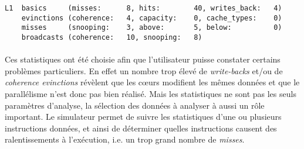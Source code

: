 \begin{lstlisting}
L1  basics     (misses:      8, hits:        40, writes_back:   4)
    evinctions (coherence:   4, capacity:    0, cache_types:    0)
    misses     (snooping:    3, above:       5, below:          0)
    broadcasts (coherence:   10, snooping:   8)
\end{lstlisting}

\paragraph{}
Ces statistiques ont été choisie afin que l'utilisateur puisse constater certains problèmes particuliers. En effet un nombre trop élevé de \emph{write-backs} et/ou de \emph{coherence evinctions} révèlent que les c\oe urs modifient les mêmes données et que le parallélisme n'est donc pas bien réalisé. Mais les statistiques ne sont pas les seuls paramètres d'analyse, la sélection des données à analyser à aussi un rôle important. Le simulateur permet de suivre les statistiques d'une ou plusieurs instructions données, et ainsi de déterminer quelles instructions causent des ralentissements à l'exécution, i.e. un trop grand nombre de \emph{misses}.


